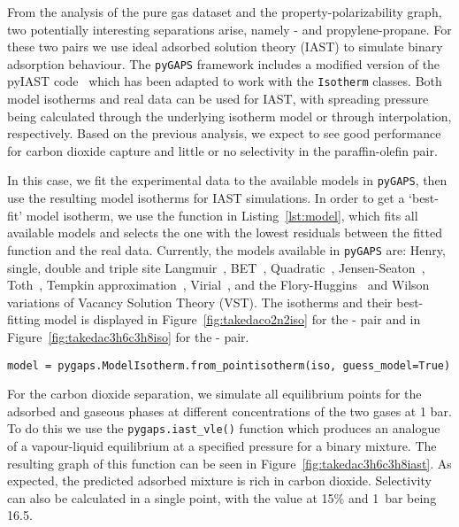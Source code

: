 From the analysis of the pure gas dataset and the property-polarizability graph, two
potentially interesting separations arise, namely - and 
propylene-propane. For these two pairs we use ideal adsorbed solution theory (IAST)
to simulate binary adsorption behaviour.
The \texttt{pyGAPS} framework includes a modified version of 
the pyIAST code~\cite{simonPyIASTIdealAdsorbed2016} which has been adapted to 
work with the \texttt{Isotherm} 
classes. Both model isotherms and real data can be used for IAST, with spreading 
pressure being calculated through the underlying isotherm model or through 
interpolation, respectively. Based on the previous analysis, we expect to see good 
performance for carbon
dioxide capture and little or no selectivity in the paraffin-olefin pair.

In this case, we fit the
experimental data to the available models in \texttt{pyGAPS}, then use the resulting model 
isotherms for IAST simulations. In order to get a `best-fit' model isotherm,
we use the function in Listing~\ref{lst:model},
which fits all available models and selects the one with the lowest 
residuals between the fitted function and the real data. Currently, the models available
in \texttt{pyGAPS} are: Henry, 
single, double and triple site Langmuir~\cite{langmuirAdsorptionGasesPlane1918a}, 
BET~\cite{brunauerAdsorptionGasesMultimolecular1938},
Quadratic~\cite{hillIntroductionStatisticalThermodynamics1986}, 
Jensen-Seaton~\cite{jensenIsothermEquationAdsorption1996}, 
Toth~\cite{tothUniformInterpretationGas},
Tempkin approximation~\cite{simonOptimizingNanoporousMaterials2014}, 
Virial~\cite{myersThermodynamicsAdsorptionPorous2002}, 
and the Flory-Huggins~\cite{cochranVacancySolutionTheory1985} and 
Wilson~\cite{suwanayuenGasAdsorptionIsotherm1980} variations of 
Vacancy Solution Theory (VST). 
The isotherms and their best-fitting model is displayed in Figure~\ref{fig:takedaco2n2iso}
for the - pair and in Figure~\ref{fig:takedac3h6c3h8iso} for the 
- pair.

\begin{lstlisting}[caption={Guessing the best model},label={lst:model}]
model = pygaps.ModelIsotherm.from_pointisotherm(iso, guess_model=True)
\end{lstlisting}

For the carbon dioxide separation, we simulate all equilibrium points for the 
adsorbed and gaseous phases at different concentrations of the two gases at 1 bar.
To do this we use the \lstinline{pygaps.iast_vle()} function which produces an 
analogue of a vapour-liquid equilibrium at a specified pressure for a binary mixture.
The resulting graph of this function can be seen in Figure~\ref{fig:takedac3h6c3h8iast}.
As expected, the predicted adsorbed mixture is rich in carbon dioxide. Selectivity can
also be calculated in a single point, with the value at 15\%  and \SI{1}{bar} 
being 16.5. 

